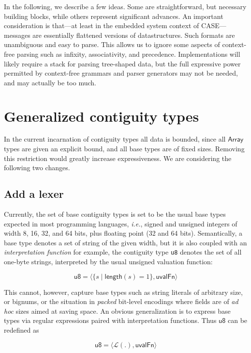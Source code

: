 \documentclass{article}
\newcommand{\ie}{\textit{i.e.}}
\newcommand{\konst}[1]{\ensuremath{\mathsf{#1}}}
\newcommand{\set}[1]{\ensuremath{\{ {#1} \}}}
\newcommand{\Lang}[1]{\ensuremath{{\mathcal L}({#1})}}
\begin{document}
In the following, we describe a few ideas. Some are straightforward,
but necessary building blocks, while others represent significant
advances. An important consideration is that---at least in the
embedded system context of CASE---messages are essentially flattened
versions of datastructures. Such formats are unambiguous and easy to
parse. This allows us to ignore some aspects of context-free parsing
such as infixity, associativity, and precedence. Implementations will
likely require a stack for parsing tree-shaped data, but the full
expressive power permitted by context-free grammars and parser
generators may not be needed, and may actually be too much.

\section{Generalized contiguity types}

In the current incarnation of contiguity types all data is bounded,
since all \konst{Array} types are given an explicit bound, and all
base types are of fixed sizes. Removing this restriction would greatly
increase expressiveness. We are considering the following two changes.

\subsection*{Add a lexer}

Currently, the set of base contiguity types is set to be the usual
base types expected in most programming languages, \ie, signed and
unsigned integers of width 8, 16, 32, and 64 bits, plus floating point
(32 and 64 bits). Semantically, a base type denotes a set of string of
the given width, but it is also coupled with an \emph{interpretation
  function} for example, the contiguity type \verb+u8+ denotes the set
of all one-byte strings, interpreted by the usual unsigned valuation
function:

  \[ \konst{u8} = \langle \set{s \mid \konst{length}(s) = 1}, \konst{uvalFn} \rangle
  \]

  This cannot, however, capture base types such as string literals of
  arbitrary size, or bignums, or the situation in \emph{packed}
  bit-level encodings where fields are of \emph{ad hoc} sizes aimed at
  saving space. An obvious generalization is to express base types via
  regular expressions paired with interpretation functions. Thus \konst{u8}
  can be redefined as

  \[ \konst{u8} = \langle \Lang{.}, \konst{uvalFn} \rangle
  \]
\end{document}

